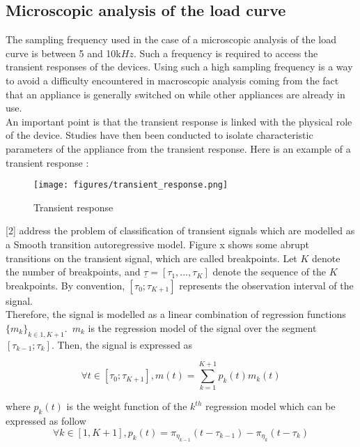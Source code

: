 
\subsection{Microscopic analysis of the load curve}
The sampling frequency used in the case of a microscopic analysis of the load curve is between 5 and 10k$Hz$. Such a frequency is required to access the transient responses of the devices. Using such a high sampling frequency is a way to avoid a difficulty encountered in macroscopic analysis coming from the fact that an appliance is generally switched on while other appliances are already in use. 
\\

An important point is that the transient response is linked with the physical role of the device. Studies have then been conducted to isolate characteristic parameters of the appliance from the transient response. Here is an example of a transient response :
\\

\begin{figure}[H]
\centering
\texttt{[image: figures/transient\_response.png]}
\caption{Transient response}
\label{fig:transient_response}
\end{figure}


[2] address the problem of classification of transient signals which are modelled as a Smooth transition autoregressive model. Figure x shows some abrupt transitions on the transient signal, which are called breakpoints. Let $K$ denote the number of breakpoints, and $\underline{\tau} = [\tau_1,...,\tau_K]$ denote the sequence of the $K$ breakpoints. By convention, $[\tau_0;\tau_{K+1}]$ represents the observation interval of the signal. 
\\

 Therefore, the signal is modelled as a linear combination of regression functions $\{m_k\}_{k\in{1,K+1}}$.~$m_k$ is the regression model of the signal over the segment $[\tau_{k-1};\tau_{k}]$. Then, the signal is expressed as

\begin{equation}
\forall t\in [\tau_0;\tau_{K+1}],m(t)= \sum_{k=1}^{K+1}p_k(t)m_k(t)
\end{equation}

where $p_k(t)$ is the weight function of the $k^{th}$ regression model which can be expressed as follow
\begin{equation}
\forall k\in [1,K+1], p_k(t)= \pi_{\eta_{k-1}}(t-\tau_{k-1})-\pi_{\eta_{k}}(t-\tau_{k})
\end{equation}

